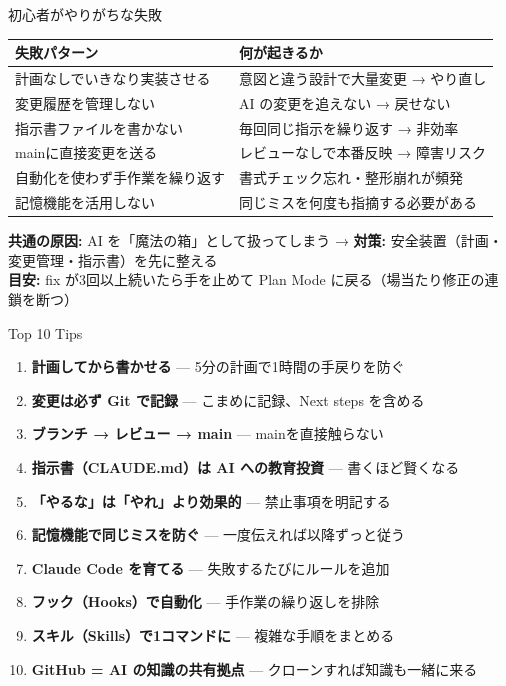 \documentclass[aspectratio=169, 14pt]{beamer}
\begin{document}
\begin{frame}{初心者がやりがちな失敗}
  \begin{table}
    \centering\footnotesize
    \begin{tabular}{p{40mm}p{55mm}}
      \hline
      \textbf{失敗パターン} & \textbf{何が起きるか} \\
      \hline
      計画なしでいきなり実装させる &
        意図と違う設計で大量変更 → やり直し \\
      変更履歴を管理しない &
        AI の変更を追えない → 戻せない \\
      指示書ファイルを書かない &
        毎回同じ指示を繰り返す → 非効率 \\
      mainに直接変更を送る &
        レビューなしで本番反映 → 障害リスク \\
      自動化を使わず手作業を繰り返す &
        書式チェック忘れ・整形崩れが頻発 \\
      記憶機能を活用しない &
        同じミスを何度も指摘する必要がある \\
      \hline
    \end{tabular}
  \end{table}

  {\scriptsize \textbf{共通の原因:}
    AI を「魔法の箱」として扱ってしまう →
    \textbf{対策:} 安全装置（計画・変更管理・指示書）を先に整える \\
    \textbf{目安:} fix が3回以上続いたら手を止めて Plan Mode に戻る（場当たり修正の連鎖を断つ）}
\end{frame}

\begin{frame}{Top 10 Tips}
  \begin{enumerate}\small
    \item \textbf{計画してから書かせる} — 5分の計画で1時間の手戻りを防ぐ
    \item \textbf{変更は必ず Git で記録} — こまめに記録、Next steps を含める
    \item \textbf{ブランチ → レビュー → main} — mainを直接触らない
    \item \textbf{指示書（CLAUDE.md）は AI への教育投資} — 書くほど賢くなる
    \item \textbf{「やるな」は「やれ」より効果的} — 禁止事項を明記する
    \item \textbf{記憶機能で同じミスを防ぐ} — 一度伝えれば以降ずっと従う
    \item \textbf{Claude Code を育てる} — 失敗するたびにルールを追加
    \item \textbf{フック（Hooks）で自動化} — 手作業の繰り返しを排除
    \item \textbf{スキル（Skills）で1コマンドに} — 複雑な手順をまとめる
    \item \textbf{GitHub = AI の知識の共有拠点} — クローンすれば知識も一緒に来る
  \end{enumerate}
\end{frame}
\end{document}
